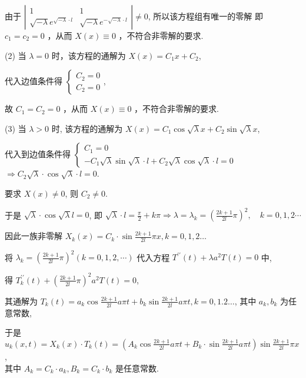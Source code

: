 \begin{questions}
\begin{solution}
由于 $ \left|\begin{array}{cc}1 & 1 \\ \sqrt{-\lambda}e^{\sqrt{-\lambda} \cdot l} & \sqrt{-\lambda}e^{-\sqrt{-\lambda} \cdot l}\end{array}\right| \neq 0 $, 所以该方程组有唯一的零解
即 $ c_{1}=c_{2}=0 $ ，从而 $ X(x) \equiv 0 $ ，不符合非零解的要求.

(2) 当 $ \lambda=0 $ 时，该方程的通解为 $ X(x)=C_{1} x+C_{2} $,

代入边值条件得 $ \left\{\begin{array}{l}C_{2}=0 \\ C_{2}=0\end{array}\right. $,

故 $ C_{1}=C_{2}=0 $ ，从而 $ X(x) \equiv 0 $ ，不符合非零解的要求.

(3) 当 $ \lambda>0 $ 时, 该方程的通解为 $ X(x)=C_{1} \cos \sqrt{\lambda} x+C_{2} \sin \sqrt{\lambda} x $,

代入到边值条件得 $ \left\{\begin{array}{l}C_{1}=0 \\ -C_{1} \sqrt{\lambda} \sin \sqrt{\lambda} \cdot l+C_{2} \sqrt{\lambda} \cos \sqrt{\lambda} \cdot l=0\end{array}\right. $
$ \Rightarrow C_{2} \sqrt{\lambda} \cdot \cos \sqrt{\lambda} \cdot l=0 $. 

要求 $ X(x) \neq 0 $, 则 $ C_{2} \neq 0 $.

于是 $ \sqrt{\lambda} \cdot \cos \sqrt{\lambda} l=0 $, 即 $ \sqrt{\lambda} \cdot l=\frac{\pi}{2}+k \pi \Rightarrow \lambda=\lambda_{k}=\left(\frac{2 k+1}{2 l} \pi\right)^{2}, \quad k=0,1,2 \cdots $

因此一族非零解 $ X_{k}(x)=C_{k} \cdot \sin \frac{2 k+1}{2 l} \pi x, k=0,1,2 \ldots $

将 $ \lambda_{k}=\left(\frac{2 k+1}{2 l} \pi\right)^{2} (k=0,1,2, \cdots) $ 代入方程 $ T^{\prime \prime}(t)+\lambda a^{2} T(t)=0 $ 中,

得 $ T_{k}^{\prime \prime}(t)+\left(\frac{2 k+1}{2 l} \pi\right)^{2}a^2 T(t)=0 $,

其通解为 $ T_{k}(t)=a_{k} \cos \frac{2 k+1}{2 l} a \pi t+b_{k} \sin \frac{2 k+1}{2 l} a \pi t, k=0,1.2 \ldots $, 其中 $ a_{k}, b_{k} $ 为任意常数,

于是 $ u_{k}(x, t)=X_{k}(x) \cdot T_{k}(t)=\left(A_{k} \cos \frac{2 k+1}{2 l} a \pi t+B_{k} \cdot \sin \frac{2 k+1}{2l} a \pi t\right) \sin \frac{2 k+1}{2l} \pi x $, \\其中 $ A_{k}=C_{k} \cdot a_{k}, B_{k}=C_{k} \cdot b_{k} $ 是任意常数.


\end{solution}
\end{questions}
